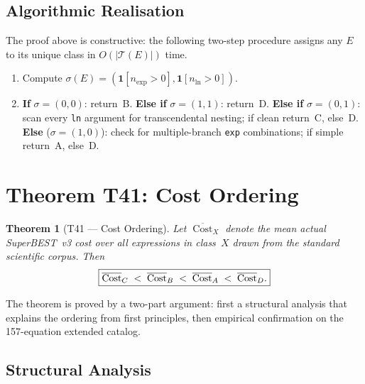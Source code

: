 \documentclass[12pt,a4paper]{article}
\newtheorem{theorem}{Theorem}[section]
\theoremstyle{definition}
\newcommand{\Cost}{\operatorname{Cost}}
\begin{document}
\subsection{Algorithmic Realisation}

The proof above is constructive: the following two-step procedure
assigns any $E$ to its unique class in $O(|\mathcal{T}(E)|)$ time.

\begin{enumerate}
  \item Compute $\sigma(E) = (\mathbf{1}[n_{\exp}>0],
        \mathbf{1}[n_{\ln}>0])$.
  \item \textbf{If} $\sigma = (0,0)$: return~B.
        \textbf{Else if} $\sigma = (1,1)$: return~D.
        \textbf{Else if} $\sigma = (0,1)$: scan every \texttt{ln}
        argument for transcendental nesting; if clean return~C, else~D.
        \textbf{Else} ($\sigma = (1,0)$): check for multiple-branch
        \texttt{exp} combinations; if simple return~A, else~D.
\end{enumerate}

\section{Theorem T41: Cost Ordering}
\label{sec:ordering}

\begin{theorem}[T41 --- Cost Ordering]
\label{thm:T41}
Let $\overline{\Cost}_X$ denote the mean actual SuperBEST~v3 cost over
all expressions in class~$X$ drawn from the standard scientific corpus.
Then
\[
  \boxed{%
    \overline{\Cost}_C \;<\; \overline{\Cost}_B \;<\;
    \overline{\Cost}_A \;<\; \overline{\Cost}_D.
  }
\]
\end{theorem}

The theorem is proved by a two-part argument: first a structural analysis
that explains the ordering from first principles, then empirical
confirmation on the 157-equation extended catalog.

\subsection{Structural Analysis}
\end{document}
